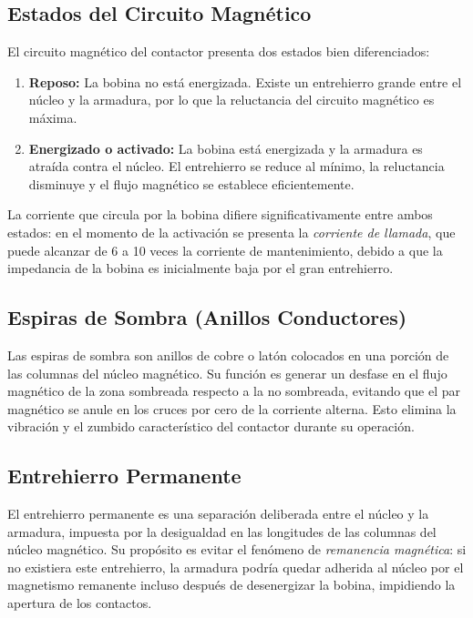 \subsection{Estados del Circuito Magnético}

El circuito magnético del contactor presenta dos estados bien diferenciados:

\begin{enumerate}
    \item \textbf{Reposo:} La bobina no está energizada. Existe un entrehierro grande entre el núcleo y la armadura, por lo que la reluctancia del circuito magnético es máxima.
    \item \textbf{Energizado o activado:} La bobina está energizada y la armadura es atraída contra el núcleo. El entrehierro se reduce al mínimo, la reluctancia disminuye y el flujo magnético se establece eficientemente.
\end{enumerate}

La corriente que circula por la bobina difiere significativamente entre ambos estados: en el momento de la activación se presenta la \textit{corriente de llamada}, que puede alcanzar de 6 a 10 veces la corriente de mantenimiento, debido a que la impedancia de la bobina es inicialmente baja por el gran entrehierro.

\subsection{Espiras de Sombra (Anillos Conductores)}

Las espiras de sombra son anillos de cobre o latón colocados en una porción de las columnas del núcleo magnético. Su función es generar un desfase en el flujo magnético de la zona sombreada respecto a la no sombreada, evitando que el par magnético se anule en los cruces por cero de la corriente alterna. Esto elimina la vibración y el zumbido característico del contactor durante su operación.

\subsection{Entrehierro Permanente}

El entrehierro permanente es una separación deliberada entre el núcleo y la armadura, impuesta por la desigualdad en las longitudes de las columnas del núcleo magnético. Su propósito es evitar el fenómeno de \textit{remanencia magnética}: si no existiera este entrehierro, la armadura podría quedar adherida al núcleo por el magnetismo remanente incluso después de desenergizar la bobina, impidiendo la apertura de los contactos.

